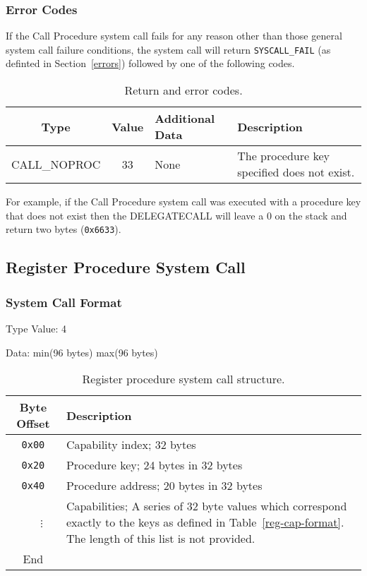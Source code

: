 \documentclass[english,a4paper]{article}
\let\oldparagraph\subsubsection
\renewcommand{\subsubsection}[1]{\oldparagraph{#1}\mbox{}}
\begin{document}
\subsubsection{Error Codes}
If the Call Procedure system call fails for any reason other than those
general system call failure conditions, the system call will return
\texttt{SYSCALL\_FAIL} (as definted in Section~\ref{errors}) followed by one of
the following codes.

\begin{table}[H]
  \caption{Return and error codes.}
  \centering{}%
  \begin{tabularx}{\textwidth}{c|c|l|X}
    \hline
    Type & Value & Additional Data & Description \\
    \hline
    \hline
    CALL\_NOPROC  & 33 & None & The procedure key specified does not exist. \\
    \hline
  \end{tabularx}
\end{table}

For example, if the Call
Procedure system call was executed with a procedure key that does not exist then
the DELEGATECALL will leave a 0 on the stack and return two bytes
(\texttt{0x6633}).

\subsection{Register Procedure System Call}

\subsubsection{System Call Format}
Type Value: 4

Data: min(96 bytes) max(96 bytes)

\begin{table}[H]
  \caption{Register procedure system call structure.}
  \centering{}%
  \begin{tabularx}{\textwidth}{c|X}
    \hline
    Byte Offset & Description\\
    \hline
    \hline
    \texttt{0x00} & Capability index; 32 bytes \\
    \texttt{0x20} & Procedure key; 24 bytes in 32 bytes \\
    \texttt{0x40} & Procedure address; 20 bytes in 32 bytes \\
    ~~~$\vdots$ & Capabilities; A series of 32 byte values which correspond
    exactly to the keys as defined in Table~\ref{reg-cap-format}. The length of
    this list is not provided. \\
    \hline
    End &  \\
    \hline
  \end{tabularx}
\end{table}
\end{document}
